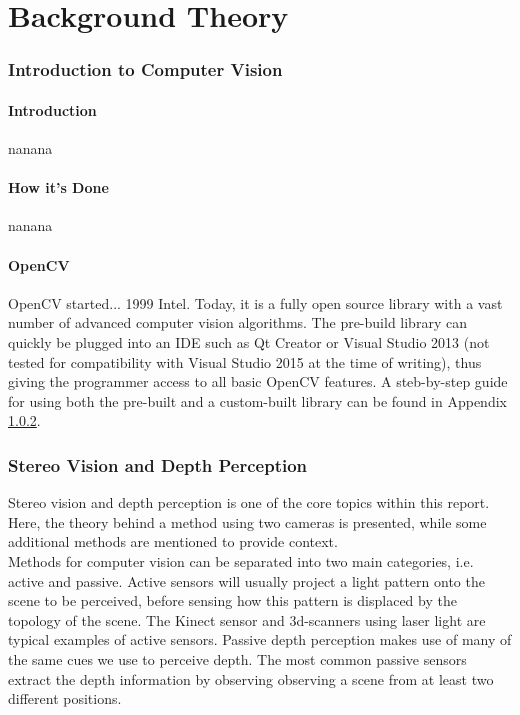 \chapter{Background Theory}

\subsection{Introduction to Computer Vision}

\subsubsection{Introduction}
nanana

\subsubsection{How it's Done}
nanana

\subsubsection{OpenCV}

OpenCV started... 1999 Intel. Today, it is a fully open source library with a vast number of advanced computer vision algorithms. The pre-build library can quickly be plugged into  an IDE such as Qt Creator or Visual Studio 2013 (not tested for compatibility with Visual Studio 2015 at the time of writing), thus giving the programmer access to all basic OpenCV features. A steb-by-step guide for using both the pre-built and a custom-built library can be found in Appendix \ref{}.

\subsection{Stereo Vision and Depth Perception}

Stereo vision and depth perception is one of the core topics within this report. Here, the theory behind a method using two cameras is presented, while some additional methods are mentioned to provide context.\\

Methods for computer vision can be separated into two main categories, i.e. active and passive. Active sensors will usually project a light pattern onto the scene to be perceived, before sensing how this pattern is displaced by the topology of the scene. The Kinect sensor and 3d-scanners using laser light are typical examples of active sensors. Passive depth perception makes use of many of the same cues we use to perceive depth. The most common passive sensors extract the depth information by observing observing a scene from at least two different positions. \\

